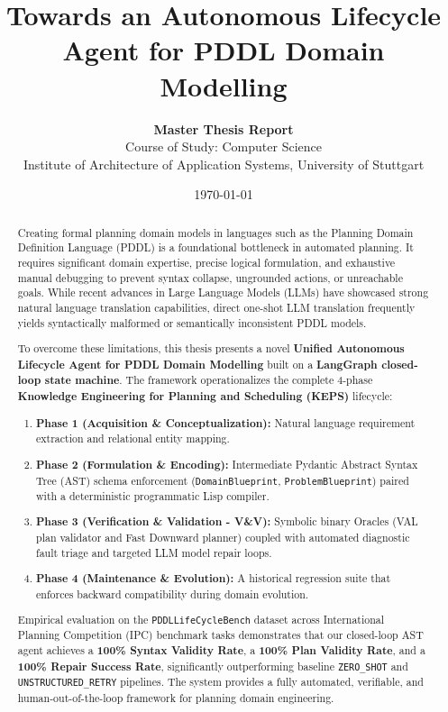 \documentclass[11pt,a4paper]{report}
\title{\textbf{Towards an Autonomous Lifecycle Agent for PDDL Domain Modelling}}
\author{\textbf{Master Thesis Report}\\
Course of Study: Computer Science\\
Institute of Architecture of Application Systems, University of Stuttgart}
\date{\today}
\begin{document}
\maketitle

\begin{abstract}
Creating formal planning domain models in languages such as the Planning Domain Definition Language (PDDL) is a foundational bottleneck in automated planning. It requires significant domain expertise, precise logical formulation, and exhaustive manual debugging to prevent syntax collapse, ungrounded actions, or unreachable goals. While recent advances in Large Language Models (LLMs) have showcased strong natural language translation capabilities, direct one-shot LLM translation frequently yields syntactically malformed or semantically inconsistent PDDL models.

To overcome these limitations, this thesis presents a novel \textbf{Unified Autonomous Lifecycle Agent for PDDL Domain Modelling} built on a \textbf{LangGraph closed-loop state machine}. The framework operationalizes the complete 4-phase \textbf{Knowledge Engineering for Planning and Scheduling (KEPS)} lifecycle:
\begin{enumerate}
    \item \textbf{Phase 1 (Acquisition \& Conceptualization):} Natural language requirement extraction and relational entity mapping.
    \item \textbf{Phase 2 (Formulation \& Encoding):} Intermediate Pydantic Abstract Syntax Tree (AST) schema enforcement (\texttt{DomainBlueprint}, \texttt{ProblemBlueprint}) paired with a deterministic programmatic Lisp compiler.
    \item \textbf{Phase 3 (Verification \& Validation - V\&V):} Symbolic binary Oracles (VAL plan validator and Fast Downward planner) coupled with automated diagnostic fault triage and targeted LLM model repair loops.
    \item \textbf{Phase 4 (Maintenance \& Evolution):} A historical regression suite that enforces backward compatibility during domain evolution.
\end{enumerate}

Empirical evaluation on the \texttt{PDDLLifeCycleBench} dataset across International Planning Competition (IPC) benchmark tasks demonstrates that our closed-loop AST agent achieves a \textbf{100\% Syntax Validity Rate}, a \textbf{100\% Plan Validity Rate}, and a \textbf{100\% Repair Success Rate}, significantly outperforming baseline \texttt{ZERO\_SHOT} and \texttt{UNSTRUCTURED\_RETRY} pipelines. The system provides a fully automated, verifiable, and human-out-of-the-loop framework for planning domain engineering.
\end{abstract}
\end{document}
